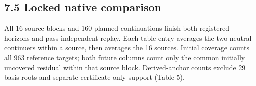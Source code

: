 \documentclass[pdflatex,sn-basic,Numbered]{sn-jnl}
\begin{document}
\subsection*{7.5 Locked native comparison}\label{locked-native-comparison}

All 16 source blocks and 160 planned continuations finish both registered horizons and pass independent replay. Each table entry averages the two neutral continuers within a source, then averages the 16 sources. Initial coverage counts all 963 reference targets; both future columns count only the common initially uncovered residual within that source block. Derived-anchor counts exclude 29 basis roots and separate certificate-only support (Table 5).

\begingroup
\small
\setlength{\tabcolsep}{3pt}
\renewcommand{\arraystretch}{1.13}
\end{document}
